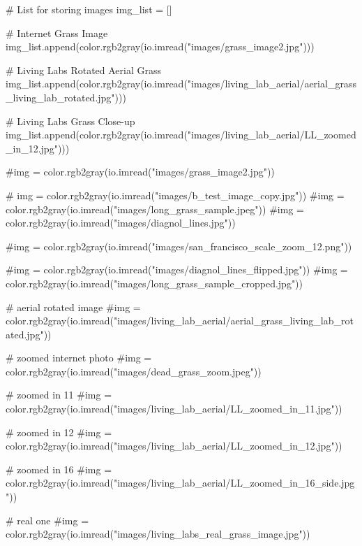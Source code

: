 \documentclass[
  letterpaper,
  DIV=11,
  numbers=noendperiod]{scrreprt}
\newenvironment{Shaded}{\begin{snugshade}}{\end{snugshade}}
\newcommand{\CommentTok}[1]{\textcolor[rgb]{0.37,0.37,0.37}{#1}}
\newcommand{\NormalTok}[1]{\textcolor[rgb]{0.00,0.23,0.31}{#1}}
\newcommand{\OperatorTok}[1]{\textcolor[rgb]{0.37,0.37,0.37}{#1}}
\newcommand{\StringTok}[1]{\textcolor[rgb]{0.13,0.47,0.30}{#1}}
\begin{document}
\begin{Shaded}
\begin{Highlighting}[]
\CommentTok{\# List for storing images}
\NormalTok{img\_list }\OperatorTok{=}\NormalTok{ []}

\CommentTok{\# Internet Grass Image}
\NormalTok{img\_list.append(color.rgb2gray(io.imread(}\StringTok{"images/grass\_image2.jpg"}\NormalTok{)))}

\CommentTok{\# Living Labs Rotated Aerial Grass}
\NormalTok{img\_list.append(color.rgb2gray(io.imread(}\StringTok{"images/living\_lab\_aerial/aerial\_grass\_living\_lab\_rotated.jpg"}\NormalTok{)))}

\CommentTok{\# Living Labs Grass Close{-}up}
\NormalTok{img\_list.append(color.rgb2gray(io.imread(}\StringTok{"images/living\_lab\_aerial/LL\_zoomed\_in\_12.jpg"}\NormalTok{)))}


\CommentTok{\#img = color.rgb2gray(io.imread("images/grass\_image2.jpg"))}

\CommentTok{\# img = color.rgb2gray(io.imread("images/b\_test\_image\_copy.jpg"))}
\CommentTok{\#img = color.rgb2gray(io.imread("images/long\_grass\_sample.jpeg"))}
\CommentTok{\#img = color.rgb2gray(io.imread("images/diagnol\_lines.jpg"))}

\CommentTok{\#img = color.rgb2gray(io.imread("images/san\_francisco\_scale\_zoom\_12.png"))}

\CommentTok{\#img = color.rgb2gray(io.imread("images/diagnol\_lines\_flipped.jpg"))}
\CommentTok{\#img = color.rgb2gray(io.imread("images/long\_grass\_sample\_cropped.jpg"))}

\CommentTok{\# aerial rotated image}
\CommentTok{\#img = color.rgb2gray(io.imread("images/living\_lab\_aerial/aerial\_grass\_living\_lab\_rotated.jpg"))}

\CommentTok{\# zoomed internet photo}
\CommentTok{\#img = color.rgb2gray(io.imread("images/dead\_grass\_zoom.jpeg"))}


\CommentTok{\# zoomed in 11}
\CommentTok{\#img = color.rgb2gray(io.imread("images/living\_lab\_aerial/LL\_zoomed\_in\_11.jpg"))}

\CommentTok{\# zoomed in 12}
\CommentTok{\#img = color.rgb2gray(io.imread("images/living\_lab\_aerial/LL\_zoomed\_in\_12.jpg"))}

\CommentTok{\# zoomed in 16}
\CommentTok{\#img = color.rgb2gray(io.imread("images/living\_lab\_aerial/LL\_zoomed\_in\_16\_side.jpg"))}



\CommentTok{\# real one}
\CommentTok{\#img = color.rgb2gray(io.imread("images/living\_labs\_real\_grass\_image.jpg"))}


\end{Highlighting}
\end{Shaded}
\end{document}
